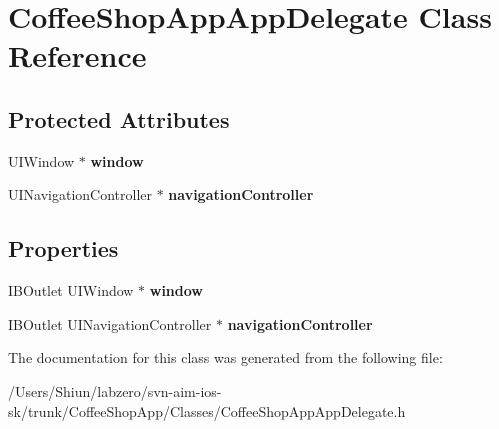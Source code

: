\hypertarget{interface_coffee_shop_app_app_delegate}{
\section{CoffeeShopAppAppDelegate Class Reference}
\label{interface_coffee_shop_app_app_delegate}
}
\subsection*{Protected Attributes}
\begin{DoxyCompactItemize}
\item 
\hypertarget{interface_coffee_shop_app_app_delegate_aeba714b95c27fff73796f22a0e26000b}{
UIWindow $\ast$ {\bfseries window}}
\label{interface_coffee_shop_app_app_delegate_aeba714b95c27fff73796f22a0e26000b}

\item 
\hypertarget{interface_coffee_shop_app_app_delegate_a5e41b19ca4053dbac8b88f8fee19c430}{
UINavigationController $\ast$ {\bfseries navigationController}}
\label{interface_coffee_shop_app_app_delegate_a5e41b19ca4053dbac8b88f8fee19c430}

\end{DoxyCompactItemize}
\subsection*{Properties}
\begin{DoxyCompactItemize}
\item 
\hypertarget{interface_coffee_shop_app_app_delegate_a3bc48e4e12252e2c29e5aeb62392f52e}{
IBOutlet UIWindow $\ast$ {\bfseries window}}
\label{interface_coffee_shop_app_app_delegate_a3bc48e4e12252e2c29e5aeb62392f52e}

\item 
\hypertarget{interface_coffee_shop_app_app_delegate_a0e6d1210bfd36c1bf76a656777df5d6b}{
IBOutlet UINavigationController $\ast$ {\bfseries navigationController}}
\label{interface_coffee_shop_app_app_delegate_a0e6d1210bfd36c1bf76a656777df5d6b}

\end{DoxyCompactItemize}


The documentation for this class was generated from the following file:\begin{DoxyCompactItemize}
\item 
/Users/Shiun/labzero/svn-\/aim-\/ios-\/sk/trunk/CoffeeShopApp/Classes/CoffeeShopAppAppDelegate.h\end{DoxyCompactItemize}
